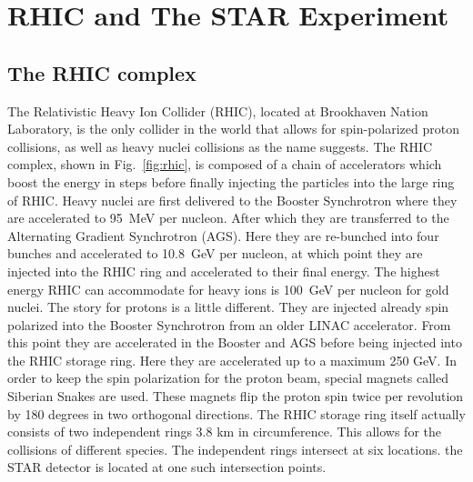 \documentclass[letterpaper, abstract = on,listof=totoc, bibliography=totoc]{scrreprt}
\begin{document}
\chapter{RHIC and The STAR Experiment}

\section{The RHIC complex}
The Relativistic Heavy Ion Collider (RHIC), located at Brookhaven Nation Laboratory, is the only collider in the world that allows for spin-polarized proton collisions, as well as heavy nuclei collisions as the name suggests. The RHIC complex, shown in Fig.~\ref{fig:rhic}, is composed of a chain of accelerators which boost the energy in steps before finally injecting the particles into the large ring of RHIC. Heavy nuclei are first delivered to the Booster Synchrotron where they are accelerated to 95~MeV per nucleon. After which they are transferred to the Alternating Gradient Synchrotron (AGS). Here they are re-bunched into four bunches and accelerated to 10.8~GeV per nucleon, at which point they are injected into the RHIC ring and accelerated to their final energy. The highest energy RHIC can accommodate for heavy ions is 100~GeV per nucleon for gold nuclei. 
The story for protons is a little different. They are injected already spin polarized into the Booster Synchrotron from an older LINAC accelerator. From this point they are accelerated in the Booster and AGS before being injected into the RHIC storage ring. Here they are accelerated up to a maximum 250 GeV. 
In order to keep the spin polarization for the proton beam, special magnets called Siberian Snakes are used. These magnets flip the proton spin twice per revolution by 180 degrees in two orthogonal directions. 
The RHIC storage ring itself actually consists of two independent rings 3.8 km in circumference. This allows for the collisions of different species. The independent rings intersect at six locations. the STAR detector is located at one such intersection points\cite{RHICoverview}.
\end{document}
